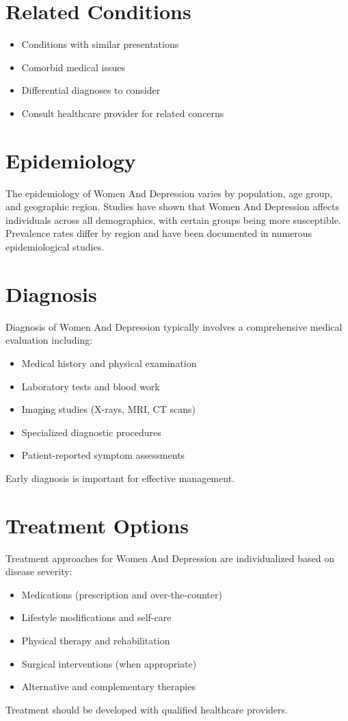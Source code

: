 \section*{Related Conditions}
\begin{itemize}
  \item Conditions with similar presentations
  \item Comorbid medical issues
  \item Differential diagnoses to consider
  \item Consult healthcare provider for related concerns
\end{itemize}

\section*{Epidemiology}
The epidemiology of Women And Depression varies by population, age group, and geographic region. Studies have shown that Women And Depression affects individuals across all demographics, with certain groups being more susceptible. Prevalence rates differ by region and have been documented in numerous epidemiological studies.

\section*{Diagnosis}
Diagnosis of Women And Depression typically involves a comprehensive medical evaluation including:
\begin{itemize}
  \item Medical history and physical examination
  \item Laboratory tests and blood work
  \item Imaging studies (X-rays, MRI, CT scans)
  \item Specialized diagnostic procedures
  \item Patient-reported symptom assessments
\end{itemize}
Early diagnosis is important for effective management.

\section*{Treatment Options}
Treatment approaches for Women And Depression are individualized based on disease severity:
\begin{itemize}
  \item Medications (prescription and over-the-counter)
  \item Lifestyle modifications and self-care
  \item Physical therapy and rehabilitation
  \item Surgical interventions (when appropriate)
  \item Alternative and complementary therapies
\end{itemize}
Treatment should be developed with qualified healthcare providers.

